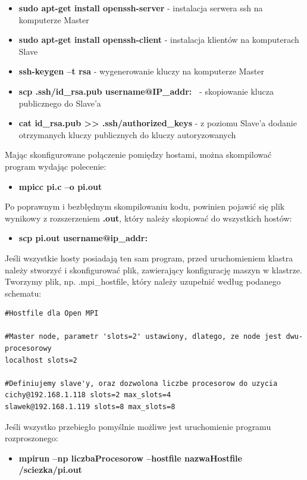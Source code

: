 \documentclass[a4paper,12pt]{article}		%
\begin{document}
\begin{itemize}
\item \textbf{sudo apt-get install openssh-server} - instalacja serwera ssh na komputerze Master
\item \textbf{sudo apt-get install openssh-client} - instalacja klientów na komputerach Slave
\item \textbf{ssh-keygen –t rsa} - wygenerowanie kluczy na komputerze Master
\item \textbf{scp .ssh/id\_rsa.pub username@IP\_addr:~} - skopiowanie klucza publicznego do Slave'a
\item \textbf{cat id\_rsa.pub >> .ssh/authorized\_keys} - z poziomu Slave'a dodanie otrzymanych kluczy publicznych do  kluczy autoryzowanych
\end{itemize}

Mając skonfigurowane połączenie pomiędzy hostami, można skompilować program wydając polecenie: 

\begin{itemize}
\item \textbf{mpicc pi.c –o pi.out}
\end{itemize}

Po poprawnym i bezbłędnym skompilowaniu kodu, powinien pojawić się plik wynikowy z rozszerzeniem \textbf{.out}, który należy skopiować do wszystkich hostów:

\begin{itemize}
\item \textbf{scp pi.out username@ip\_addr:~}
\end{itemize}

Jeśli wszystkie hosty posiadają ten sam program, przed uruchomieniem klastra należy stworzyć i skonfigurować plik, zawierający konfigurację maszyn w klastrze. Tworzymy plik, np. .mpi\_hostfile, który należy uzupełnić według podanego schematu:

\begin{lstlisting}
#Hostfile dla Open MPI

#Master node, parametr 'slots=2' ustawiony, dlatego, ze node jest dwu-procesorowy
localhost slots=2

#Definiujemy slave'y, oraz dozwolona liczbe procesorow do uzycia
cichy@192.168.1.118 slots=2 max_slots=4
slawek@192.168.1.119 slots=8 max_slots=8
\end{lstlisting}

Jeśli wszystko przebiegło pomyślnie możliwe jest uruchomienie programu rozproszonego:
\begin{itemize}
\item \textbf{mpirun –np liczbaProcesorow –hostfile nazwaHostfile /sciezka/pi.out}
\end{itemize}
\end{document}

